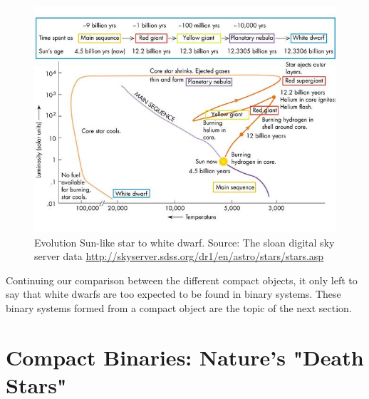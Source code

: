\begin{figure}[]
        \centering
\includegraphics[scale=2]{assets/images/starevol.jpg}
\caption{Evolution Sun-like star to white dwarf. Source: The sloan digital sky server data \protect\url{http://skyserver.sdss.org/dr1/en/astro/stars/stars.asp}}
\label{fig:hrwd}
\end{figure}

Continuing our comparison between the different compact objects, it only left to say that white dwarfs are too expected to be found in binary systems. These binary systems formed from a compact object are the topic of the next section. 

\section[Compact Binaries]{Compact Binaries: Nature's "Death Stars"}\label{sec:cb}

